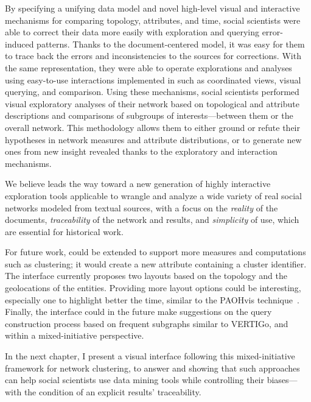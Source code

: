 By specifying a unifying data model and novel high-level visual and interactive mechanisms for comparing topology, attributes, and time, social scientists were able to correct their data more easily with exploration and querying error-induced patterns.
Thanks to the document-centered model, it was easy for them to trace back the errors and inconsistencies to the sources for corrections.
With the same representation, they were able to operate explorations and analyses using easy-to-use interactions implemented in \name such as coordinated views, visual querying, and comparison.
Using these mechanisms, social scientists performed visual exploratory analyses of their network based on topological and attribute descriptions and comparisons of subgroups of interests---between them or the overall network.
This methodology allows them to either ground or refute their hypotheses in network measures and attribute distributions, or to generate new ones from new insight revealed thanks to the exploratory and interaction mechanisms.

We believe \name leads the way toward a new generation of highly interactive exploration tools applicable to wrangle and analyze a wide variety of real social networks modeled from textual sources, with a focus on the \emph{reality} of the documents, \emph{traceability} of the network and results,  and \emph{simplicity} of use, which are essential for historical work.

For future work, \name could be extended to support more \sna measures and computations such as clustering; it would create a new attribute containing a cluster identifier.
The interface currently proposes two layouts based on the topology and the geolocations of the entities.
Providing more layout options could be interesting, especially one to highlight better the time, similar to the PAOHvis technique~\cite{valdiviaAnalyzingDynamicHypergraphs2021}.
Finally, the interface could in the future make suggestions on the query construction process based on frequent subgraphs similar to VERTIGo\cite{cuencaVERTIGoVisualPlatform2021}, and within a mixed-initiative perspective\cite{makoninMixedInitiativeBigData2016}.

In the next chapter, I present a visual interface following this mixed-initiative framework for network clustering, to answer \qthree and showing that such approaches can help social scientists use data mining tools while controlling their biases---with the condition of an explicit results' traceability.



